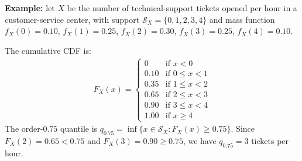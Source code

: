\begin{solproblema}[prob:e538b1b]
	\textbf{Example:} let $X$ be the number of technical-support tickets opened per hour in a customer-service center, with support $\mathcal{S}_X=\{0,1,2,3,4\}$ and mass function $f_X(0)=0.10$, $f_X(1)=0.25$, $f_X(2)=0.30$, $f_X(3)=0.25$, $f_X(4)=0.10$.

	The cumulative CDF is:
	\begin{align*}
		F_X(x) = \begin{cases}
			0 & \text{if } x<0 \\
			0.10 & \text{if } 0\le x<1 \\
			0.35 & \text{if } 1\le x<2 \\
			0.65 & \text{if } 2\le x<3 \\
			0.90 & \text{if } 3\le x<4 \\
			1.00 & \text{if } x\ge4
		\end{cases}
	\end{align*}
	The order-$0.75$ quantile is $q_{0.75} = \inf\{x \in \mathcal{S}_X : F_X(x)\ge0.75\}$. Since $F_X(2)=0.65<0.75$ and $F_X(3)=0.90\ge0.75$, we have $q_{0.75}=3$ tickets per hour.
\end{solproblema}
